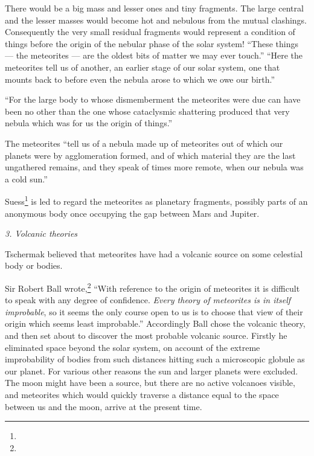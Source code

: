 \documentclass[a4paper, 12pt, oneside]{article}
\begin{document}
There would be a big mass and lesser ones and tiny fragments. The large central and the lesser masses would become hot and nebulous from the mutual clashings. Consequently the very small residual fragments would represent a condition of things before the origin of the nebular phase of the solar system! ``These things --- the meteorites --- are the oldest bits of matter we may ever touch.'' ``Here the meteorites tell us of another, an earlier stage of our solar system, one that mounts back to before even the nebula arose to which we owe our birth.''

``For the large body to whose dismemberment the meteorites were due can have been no other than the one whose cataclysmic shattering produced that very nebula which was for us the origin of things.''

The meteorites ``tell us of a nebula made up of meteorites out of which our planets were by agglomeration formed, and of which material they are the last ungathered remains, and they speak of times more remote, when our nebula was a cold sun.''

Suess\footnote{} is led to regard the meteorites as planetary fragments, possibly parts of an anonymous body once occupying the gap between Mars and Jupiter.

\bigskip
\centerline{\emph{3. Volcanic theories}}

Tschermak believed that meteorites have had a volcanic source on some celestial body or bodies.

Sir Robert Ball wrote,\footnote{} ``With reference to the origin of meteorites it is difficult to speak with any degree of confidence. \emph{Every theory of meteorites is in itself improbable}, so it seems the only course open to us is to choose that view of their origin which seems least improbable.'' Accordingly Ball chose the volcanic theory, and then set about to discover the most probable volcanic source. Firstly he eliminated space beyond the solar system, on account of the extreme improbability of bodies from such distances hitting such a microscopic globule as our planet. For various other reasons the sun and larger planets were excluded. The moon might have been a source, but there are no active volcanoes visible, and meteorites which would quickly traverse a distance equal to the space between us and the moon, arrive at the present time.
\end{document}

